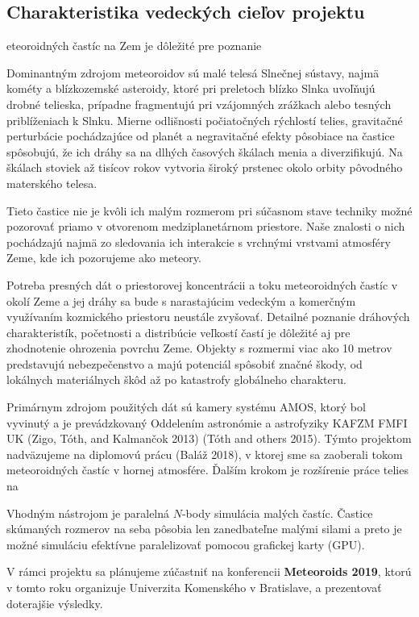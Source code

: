 \subsection{Charakteristika vedeckých cieľov
projektu}\label{charakteristika-vedeckuxfdch-cieux13eov-projektu}

eteoroidných častíc na Zem je dôležité pre poznanie

Dominantným zdrojom meteoroidov sú malé telesá Slnečnej sústavy, najmä
kométy a blízkozemské asteroidy, ktoré pri preletoch blízko Slnka
uvoľňujú drobné telieska, prípadne fragmentujú pri vzájomných zrážkach
alebo tesných priblíženiach k Slnku. Mierne odlišnosti počiatočných
rýchlostí telies, gravitačné perturbácie pochádzajúce od planét a
negravitačné efekty pôsobiace na častice spôsobujú, že ich dráhy sa na
dlhých časových škálach menia a diverzifikujú. Na škálach stoviek až
tisícov rokov vytvoria široký prstenec okolo orbity pôvodného materského
telesa.

Tieto častice nie je kvôli ich malým rozmerom pri súčasnom stave
techniky možné pozorovať priamo v otvorenom medziplanetárnom priestore.
Naše znalosti o nich pochádzajú najmä zo sledovania ich interakcie s
vrchnými vrstvami atmosféry Zeme, kde ich pozorujeme ako meteory.

Potreba presných dát o priestorovej koncentrácii a toku meteoroidných
častíc v okolí Zeme a jej dráhy sa bude s narastajúcim vedeckým a
komerčným využívaním kozmického priestoru neustále zvyšovať. Detailné
poznanie dráhových charakteristík, početnosti a distribúcie veľkostí
častí je dôležité aj pre zhodnotenie ohrozenia povrchu Zeme. Objekty s
rozmermi viac ako 10 metrov predstavujú nebezpečenstvo a majú potenciál
spôsobiť značné škody, od lokálnych materiálnych škôd až po katastrofy
globálneho charakteru.

Primárnym zdrojom použitých dát sú kamery systému AMOS, ktorý bol
vyvinutý a je prevádzkovaný Oddelením astronómie a astrofyziky KAFZM
FMFI UK (Zigo, Tóth, and Kalmančok 2013) (Tóth and others 2015). Týmto
projektom nadväzujeme na diplomovú prácu (Baláž 2018), v ktorej sme sa
zaoberali tokom meteoroidných častíc v hornej atmosfére. Ďalším krokom
je rozšírenie práce telies na

Vhodným nástrojom je paralelná \(N\)-body simulácia malých častíc.
Častice skúmaných rozmerov na seba pôsobia len zanedbateľne malými
silami a preto je možné simuláciu efektívne paralelizovať pomocou
grafickej karty (GPU).

V rámci projektu sa plánujeme zúčastniť na konferencii
\textbf{Meteoroids 2019}, ktorú v tomto roku organizuje Univerzita
Komenského v Bratislave, a prezentovať doterajšie výsledky.

